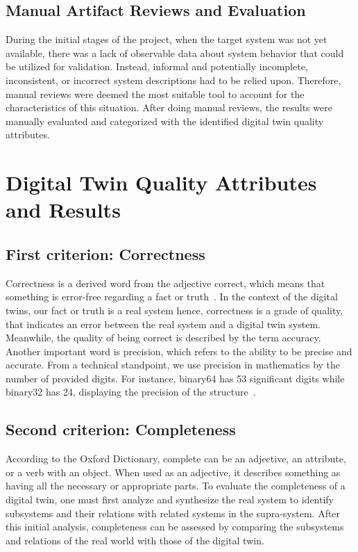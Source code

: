 \documentclass{llncs}
\begin{document}
    \subsection{Manual Artifact Reviews and Evaluation}
    During the initial stages of the project, when the target system was not yet available, there was a lack of observable data about system behavior that could be utilized for validation. 
    Instead, informal and potentially incomplete, inconsistent, or incorrect system descriptions had to be relied upon. Therefore, manual reviews were deemed the most suitable tool to account for the characteristics 
    of this situation. After doing manual reviews, the results were manually evaluated and categorized with the identified digital twin quality attributes. 

   
    \section{Digital Twin Quality Attributes and Results}
    
    \subsection*{First criterion: Correctness}
    Correctness is a  derived word from the adjective correct, which means that something is error-free regarding a fact or truth~\cite{OxfordDictionary}. 
    In the context of the digital twins, our fact or truth is a real system hence, correctness is a grade of quality, that indicates an error between the real system and a digital twin system.
    Meanwhile, the quality of being correct is described by the term accuracy. Another important word is precision, 
    which refers to the ability to be precise and accurate\cite{OxfordDictionary}. 
    From a technical standpoint, we use precision in mathematics by the number of provided digits. 
    For instance, binary64 has 53 significant digits while binary32 has 24, displaying the precision of the structure~\cite{IEE754}.  
    
    \subsection*{Second criterion: Completeness}
    According to the Oxford Dictionary, complete can be an adjective, an attribute, or  a verb with an object\cite{OxfordDictionary}. 
    When used as an adjective, it describes something 
    as having all the necessary or appropriate parts. To evaluate the completeness of a digital twin, 
    one must first analyze and synthesize the real system to identify subsystems and their relations with related systems in the supra-system. 
    After this initial analysis, completeness can be assessed by comparing the subsystems and relations of the real world with those of the digital twin.
\end{document}
